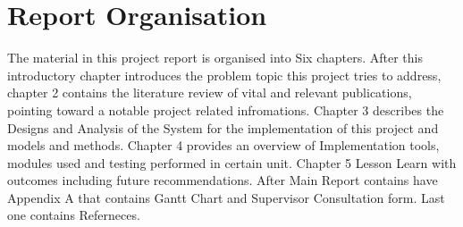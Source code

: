 \section{Report Organisation}
The material in this project report is organised into Six chapters. After this introductory chapter introduces the problem topic this project tries to address, chapter 2 contains the literature review of vital and relevant publications, pointing toward a notable project related infromations. Chapter 3 describes the Designs and Analysis of the System for the implementation of this project and models and methods. Chapter 4 provides an overview of Implementation tools, modules used and testing performed in certain unit. Chapter 5 Lesson Learn with outcomes including future recommendations. After Main Report contains have Appendix A that contains Gantt Chart and Supervisor Consultation form. Last one contains Referneces.